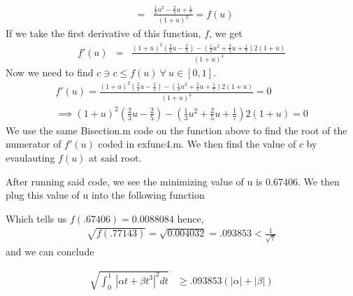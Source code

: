 \documentclass[11pt]{SelfArxOneColBMN}
\begin{document}
\begin{solution}
\begin{eqnarray*}
  \\
  &=& \frac{\frac{1}{3}u^2 - \frac{2}{5}u + \frac{1}{7}}{(1+u)^2} = f(u)
  \end{eqnarray*}
  If we take the first derivative of this function, $f$, we get
  \begin{eqnarray*}
    f'(u) &=& \frac{(1 + u)^2(\frac{2}{3}u - \frac{2}{5}) - (\frac{1}{3}u^2 +\frac{2}{5}u + \frac{1}{7})2(1 + u)}{(1 + u)^4}
  \end{eqnarray*}
  Now we need to find $c \ni c \leq f(u) \: \forall \: u \in [0,1]$. 
  \begin{eqnarray*}
    f'(u) = \frac{(1 + u)^2(\frac{2}{3}u - \frac{2}{5}) - (\frac{1}{3}u^2 +\frac{2}{5}u + \frac{1}{7})2(1 + u)}{(1 + u)^4} = 0\\
    \implies (1 + u)^2(\frac{2}{3}u - \frac{2}{5}) - (\frac{1}{3}u^2 +\frac{2}{5}u + \frac{1}{7})2(1 + u) = 0
  \end{eqnarray*}
  We use the same Bisection.m code on the function above to find the root of the numerator of $f'(u)$ coded in exfunc4.m. We then find the value of $c$ by evaulauting $f(u)$ at said root.

  \singlespacing
  
  \onehalfspacing

  After running said code, we see the minimizing value of u is $0.67406$. We then plug this value of u into the following function  
  \singlespacing 
  
  \onehalfspacing

  Which tells us $f(.67406) = 0.0088084$ hence,
  \begin{eqnarray*}
  \sqrt{f(.77143)} = \sqrt{0.004032} = .093853 < \frac{1}{\sqrt{7}}
  \end{eqnarray*}
  and we can conclude

  \begin{eqnarray*}
  \sqrt{\int_0^1 \: | \alpha t + \beta t^3|^2 dt} &\geq .093853( |\alpha| + |\beta|)
  \end{eqnarray*}
\end{solution}
\end{document}

